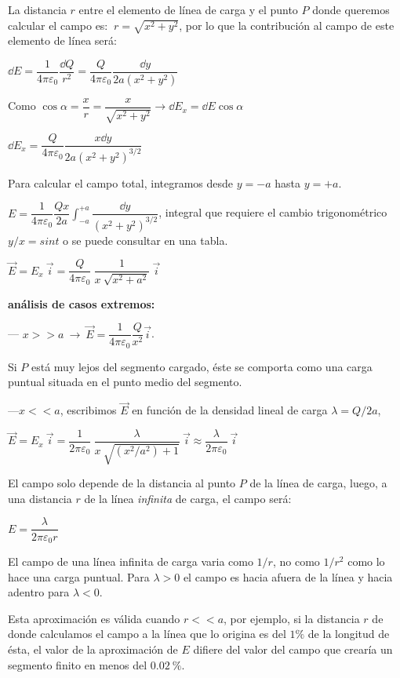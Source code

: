La distancia $r$ entre el elemento de línea de carga y el punto $P$ donde queremos calcular el campo es: $\ r=\sqrt{x^2+y^2}$, por lo que la contribución al campo de este elemento de línea será:

$\dd E=\dfrac 1 {4\pi \varepsilon_0} \dfrac{\dd Q}{r^2}=\dfrac Q {4\pi \varepsilon_0} \dfrac{\dd y}{2a(x^2+y^2)}$

Como $\cos \alpha=\dfrac{x}{r}=\dfrac{x}{\sqrt{x^2+y^2}} \to \dd E_x=\dd E \cos \alpha$

$\dd E_x=\dfrac Q {4\pi \varepsilon_0} \dfrac{x\dd y}{2a(x^2+y^2)^{3/2}}$

Para calcular el campo total, integramos desde $y=-a$ hasta $y=+a$.

$\displaystyle E=\dfrac 1 {4\pi \varepsilon_0} \dfrac{Qx}{2a} \int_{-a}^{+a} \dfrac{\dd y}{(x^2+y^2)^{3/2}}$, integral que requiere el cambio trigonométrico $y/x=sin t$ o se puede consultar en una tabla.

$\vec E=E_x \ \vec i = \dfrac Q {4\pi \varepsilon_0} \ \dfrac{1}{x \ \sqrt{x^2+a^2}} \ \vec i$


\textbf{análisis de casos extremos:}

--- $x>>a\ \to \ \vec E= \dfrac 1 {4\pi \varepsilon_0} \dfrac{Q}{x^2} \vec i$. 

Si $P$ está muy lejos del segmento cargado, éste se comporta como una carga puntual situada en el punto medio del segmento.

---$x<<a$, escribimos $\vec E $ en función de la densidad lineal de carga $\lambda=Q/2a$,

$\vec E=E_x \ \vec i = \dfrac 1 {2\pi \varepsilon_0} \ \dfrac{\lambda}{x \ \sqrt{(x^2/a^2)+1}} \ \vec i \approx \dfrac{\lambda}{2\pi \varepsilon_0}\ \vec i$

El campo solo depende de la distancia al punto $P$ de la línea de carga, luego, a una distancia $r$ de la línea \emph{infinita} de carga, el campo será:

$E=\dfrac{\lambda}{2\pi \varepsilon_0 r}$

El campo de una línea infinita de carga varia como $1/r$, no como $1/r^2$ como lo hace una carga puntual. Para $\lambda>0$ el campo es hacia afuera de la línea y hacia adentro para $\lambda <0$.

Esta aproximación es válida cuando $r<<a$, por ejemplo, si la distancia $r$ de donde calculamos el campo a la línea que lo origina es del $1\%$ de la longitud de ésta, el valor de la aproximación de $E$ difiere del valor del campo que crearía un segmento finito en menos del $0.02\ \%$.

